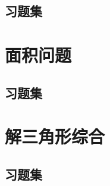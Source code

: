 \startexercise

\subsection*{习题集}






\stopexercise

\section{面积问题}

\startexercise

\subsection*{习题集}



\stopexercise

\section{解三角形综合}

\startexercise

\subsection*{习题集}



\stopexercise
